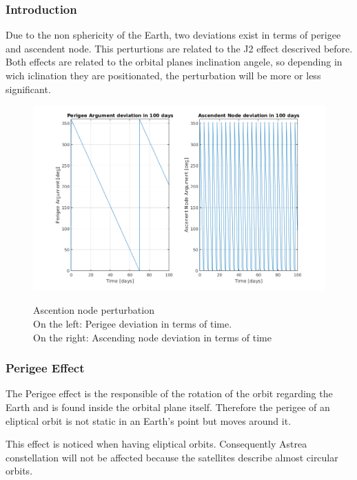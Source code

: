 \subsubsection{Introduction}

Due to the non sphericity of the Earth, two deviations exist in terms of perigee and ascendent node. This perturtions are related to the J2 effect descrived before.
Both effects are related to the orbital planes inclination angele, so depending in wich iclination they are positionated, the perturbation will be more or less  significant.

\begin{figure}[H] %
	\centering
	\includegraphics[width=.8\textwidth]{./decay/Inclination.png}\\
	\caption{Ascention node perturbation\\
			On the left: Perigee deviation in terms of time.\\
			On the right: Ascending node deviation in terms of time}
	\label{fig:Inclination} 
\end{figure}

\subsubsection{Perigee Effect}

The Perigee effect is the responsible of the rotation of the orbit regarding the Earth and is found inside the orbital plane itself. Therefore the perigee of an eliptical orbit is not static in an Earth's point but moves around it. 

This effect is noticed when having eliptical orbits. Consequently Astrea constellation will not be affected because the satellites describe almost circular orbits.


